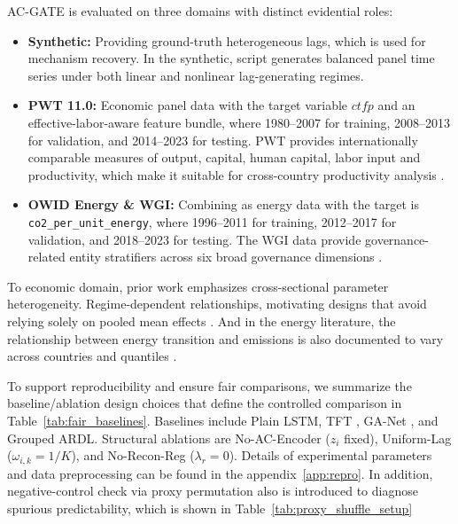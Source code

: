 \documentclass[conference]{IEEEtran}
\begin{document}
AC-GATE is evaluated on three domains with distinct evidential roles:
\begin{itemize}
\item \textbf{Synthetic:}
Providing ground-truth heterogeneous lags, which is used for mechanism recovery. In the synthetic, script generates balanced panel time series under both linear and nonlinear lag-generating regimes. 
\item \textbf{PWT 11.0:}
 Economic panel data with the target variable $ctfp$ and an effective-labor-aware feature bundle, where 1980--2007 for training, 2008--2013 for validation, and 2014--2023 for testing. PWT provides internationally comparable measures of output, capital, human capital, labor input and productivity, which make it suitable for cross-country productivity analysis \cite{feenstra2015pwt}.
\item \textbf{OWID Energy \& WGI:}
Combining as energy data with the target is \texttt{co2\_per\_unit\_energy}, where 1996--2011 for training, 2012--2017 for validation, and 2018--2023 for testing. The WGI data provide governance-related entity stratifiers across six broad governance dimensions \cite{kaufmann2011wgi}.
\end{itemize}

To economic domain, prior work emphasizes cross-sectional parameter heterogeneity. Regime-dependent relationships, motivating designs that avoid relying solely on pooled mean effects \cite{canay2011sim,hansen1999thr,pesaran1995pmg}. And in the energy literature, the relationship between energy transition and emissions is also documented to vary across countries and quantiles \cite{akram2020energy,mirziyoyeva2022re}.



To support reproducibility and ensure fair comparisons, we summarize the baseline/ablation design choices that define the controlled comparison in Table~\ref{tab:fair_baselines}. Baselines include Plain LSTM, TFT \cite{lim2021tft}, GA-Net \cite{xue2020gated}, and Grouped ARDL\cite{pesaran1995pmg,babii2021mlpanel}. Structural ablations are No-AC-Encoder ($z_i$ fixed), Uniform-Lag ($\omega_{i,k}=1/K$), and No-Recon-Reg ($\lambda_r=0$). Details of experimental parameters and data preprocessing can be found in the appendix~\ref{app:repro}. In addition, negative-control check via proxy permutation also is introduced to diagnose spurious predictability, which is shown in Table~\ref{tab:proxy_shuffle_setup}
\end{document}
